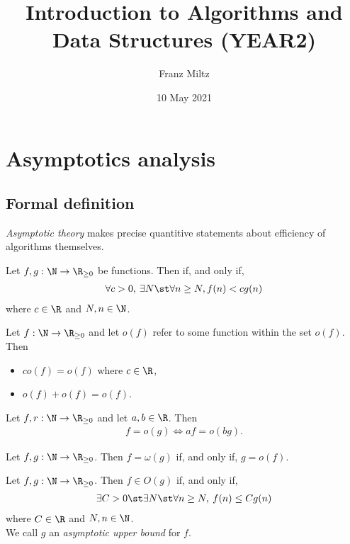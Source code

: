 \documentclass{article}
\begin{document}
\title{Introduction to Algorithms and Data Structures (YEAR2)}
\author{Franz Miltz}
\date{10 May 2021}
\maketitle
\setcounter{tocdepth}{2}
\tableofcontents
\pagebreak


\section{Asymptotics analysis}

\subsection{Formal definition}

\emph{Asymptotic theory} makes precise quantitive statements about efficiency of algorithms themselves.
\begin{definition}
	Let $f,g:\N\to\R_{\geq 0}$ be functions. Then
	 if, and only if, 
	\begin{align*}
		\forall c>0,\:\exists N\st \forall n \geq N, f(n)<cg(n)
	\end{align*}
	where $c\in\R$ and $N,n\in\N$.
\end{definition}
\begin{theorem}
	Let $f:\N\to\R_{\geq 0}$ and let $o(f)$ refer to some
	function within the set $o(f)$. Then
	\begin{itemize}
		\item $co(f)=o(f)$ where $c\in\R$,
		\item $o(f) + o(f) = o(f)$.
	\end{itemize}
\end{theorem}
\begin{theorem}
	Let $f,r:\N\to\R_{\geq 0}$ and let $a,b\in\R$. Then
	\begin{align*}
		f=o(g) \Leftrightarrow af=o(bg).	
	\end{align*}
\end{theorem}
\begin{definition}
	Let $f,g:\N\to\R_{\geq 0}$. Then $f=\omega(g)$ if, and only if, $g=o(f)$.
\end{definition}
\begin{definition}
	Let $f,g:\N\to\R_{\geq 0}$. Then $f\in O(g)$ if, and only if,
	\begin{align*}
		\exists C > 0\st \exists N \st \forall n \geq N,\: f(n) \leq Cg(n)
	\end{align*}
	where $C\in\R$ and $N,n\in\N$.\\
	We call $g$ an \emph{asymptotic upper bound} for $f$.
\end{definition}
\end{document}
